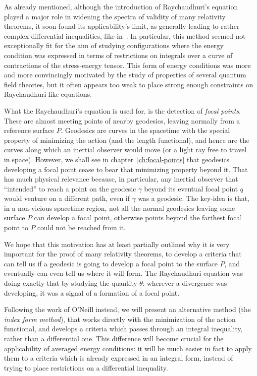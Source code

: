As already mentioned, although the introduction of Raychaudhuri's equation played a major role in widening the spectra of validity of many relativity theorems, it soon found its applicability's limit, as generally leading to rather complex differential inequalities, like in~\cite[]{fewster2011singularity}.
In particular, this method seemed not exceptionally fit for the aim of studying configurations where the energy condition was expressed in terms of restrictions on integrals over a curve of contractions of the stress-energy tensor. This form of energy conditions was more and more convincingly motivated by the study of properties of several quantum field theories, but it often appears too weak to place strong enough constraints on Raychaudhuri-like equations.

What the Raychaudhuri's equation is used for, is the detection of \emph{focal points}. These are almost meeting points of nearby geodesics, leaving normally from a reference surface \(P\). Geodesics are curves in the spacetime with the special property of minimizing the action (and the length functional), and hence are the curves along which an inertial observer would move (or a light ray free to travel in space). However, we shall see in chapter~\ref{ch:focal-points} that geodesics developing a focal point cease to bear that minimizing property beyond it. 
That has much physical relevance because, in particular, any inertial observer that ``intended'' to reach a point on the geodesic \(\gamma\) beyond its eventual focal point \(q\) would venture on a different path, even if \(\gamma\) was a geodesic.
The key-idea is that, in a non-vicious spacetime region, not all the normal geodesics leaving some surface \(P\) can develop a focal point, otherwise points beyond the farthest focal point to \(P\) could not be reached from it. 

We hope that this motivation has at least partially outlined why it is very important for the proof of many relativity theorems, to develop a criteria that can tell us if a geodesic is going to develop a focal point to the surface \(P\), and eventually can even tell us where it will form. The Raychaudhuri equation was doing exactly that by studying the quantity \(\theta\): wherever a divergence was developing, it was a signal of a formation of a focal point.

Following the work of O'Neill instead, we will present an alternative method (the \emph{index form method}), that works directly with the minimization of the action functional, and develops a criteria which passes through an integral inequality, rather than a differential one. This difference will become crucial for the applicability of averaged energy conditions: it will be much easier in fact to apply them to a criteria which is already expressed in an integral form, instead of trying to place restrictions on a differential inequality.

